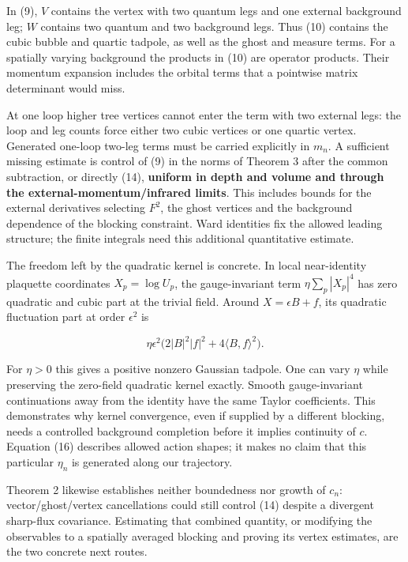 \documentclass[11pt,a4paper]{article}
\begin{document}
In (9), \(V\) contains the vertex with two quantum legs and one external
background leg; \(W\) contains two quantum and two background legs. Thus
(10) contains the cubic bubble and quartic tadpole, as well as the ghost
and measure terms. For a spatially varying background the products in
(10) are operator products. Their momentum expansion includes the
orbital terms that a pointwise matrix determinant would miss.

At one loop higher tree vertices cannot enter the term with two external
legs: the loop and leg counts force either two cubic vertices or one
quartic vertex. Generated one-loop two-leg terms must be carried
explicitly in \(m_n\). A sufficient missing estimate is control of (9)
in the norms of Theorem 3 after the common subtraction, or directly
(14), \textbf{uniform in depth and volume and through the
external-momentum/infrared limits}. This includes bounds for the
external derivatives selecting \(F^2\), the ghost vertices and the
background dependence of the blocking constraint. Ward identities fix
the allowed leading structure; the finite integrals need this additional
quantitative estimate.

The freedom left by the quadratic kernel is concrete. In local
near-identity plaquette coordinates \(X_p=\log U_p\), the
gauge-invariant term \(\eta\sum_p|X_p|^4\) has zero quadratic and cubic
part at the trivial field. Around \(X=\epsilon B+f\), its quadratic
fluctuation part at order \(\epsilon^2\) is

\[\eta\epsilon^2\bigl(2|B|^2|f|^2+4\langle B,f\rangle^2\bigr). \tag{16}\]

For \(\eta>0\) this gives a positive nonzero Gaussian tadpole. One can
vary \(\eta\) while preserving the zero-field quadratic kernel exactly.
Smooth gauge-invariant continuations away from the identity have the
same Taylor coefficients. This demonstrates why kernel convergence, even
if supplied by a different blocking, needs a controlled background
completion before it implies continuity of \(c\). Equation (16)
describes allowed action shapes; it makes no claim that this particular
\(\eta_n\) is generated along our trajectory.

Theorem 2 likewise establishes neither boundedness nor growth of
\(c_n\): vector/ghost/vertex cancellations could still control (14)
despite a divergent sharp-flux covariance. Estimating that combined
quantity, or modifying the observables to a spatially averaged blocking
and proving its vertex estimates, are the two concrete next routes.
\end{document}
